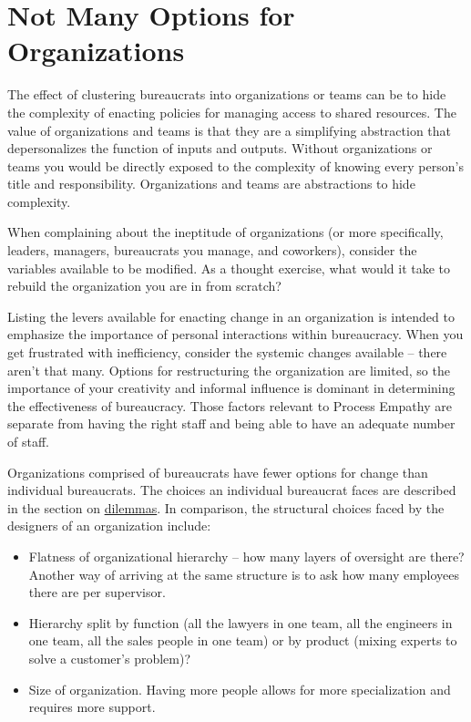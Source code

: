 \section{Not Many Options for Organizations}

The effect of clustering bureaucrats into organizations or teams can be to hide the complexity of enacting policies for managing access to shared resources. The value of organizations and teams is that they are a simplifying abstraction that depersonalizes the function of inputs and outputs. Without organizations or teams you would be directly exposed to the complexity of knowing every person's title and responsibility. Organizations and teams are abstractions to hide complexity.

When complaining about the ineptitude of organizations (or more specifically, leaders, managers, bureaucrats you manage, and coworkers), consider the variables available to be modified. As a thought exercise, what would it take to rebuild the organization you are in from scratch? 

Listing the levers available for enacting change in an organization is intended to emphasize the importance of personal interactions within bureaucracy. When you get frustrated with inefficiency, consider the systemic changes available -- there aren't that many. Options for restructuring the organization are limited, so the importance of your creativity and informal influence is dominant in determining the effectiveness of bureaucracy. Those factors relevant to Process Empathy are separate from having the right staff and being able to have an adequate number of staff. 

Organizations comprised of bureaucrats have fewer options for change than individual bureaucrats. The choices an individual bureaucrat faces are described
\iftoggle{haspagenumbers}{on page~\pageref{sec:dilemma-trilemma}}{ }
 in the section on 
\hyperref[sec:dilemma-trilemma]{dilemmas}.
In comparison, the structural choices faced by the designers of an organization include:
\begin{itemize}
    \item Flatness of organizational hierarchy -- how many layers of oversight are there? Another way of arriving at the same structure is to ask how many employees there are per supervisor.
    \item Hierarchy split by function (all the lawyers in one team, all the engineers in one team, all the sales people in one team) or by product (mixing experts to solve a customer's problem)?

    
    \item Size of organization. Having more people allows for more specialization and requires more support. 
\end{itemize}


